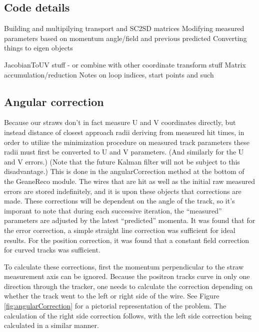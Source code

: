 \documentclass{article}
\begin{document}
\subsection{Code details}

Building and multipilying transport and SC2SD matrices
Modifying measured parameters based on momentum angle/field and previous predicted
Converting things to eigen objects

JacobianToUV stuff - or combine with other coordinate transform stuff
Matrix accumulation/reduction
Notes on loop indices, start points and such

\subsection{Angular correction}

Because our straws don't in fact measure U and V coordinates directly, but instead distance of closest approach radii deriving from measured hit times, in order to utilize the minimization procedure on measured track parameters these radii must first be converted to U and V parameters. (And similarly for the U and V errors.) (Note that the future Kalman filter will not be subject to this disadvantage.) This is done in the angularCorrection method at the bottom of the GeaneReco module. The wires that are hit as well as the initial raw measured errors are stored indefinitely, and it is upon these objects that corrections are made. These corrections will be dependent on the angle of the track, so it's imporant to note that during each successive iteration, the ``measured'' parameters are adjusted by the latest ``predicted'' momenta. It was found that for the error correction, a simple straight line correction was sufficient for ideal results. For the position correction, it was found that a constant field correction for curved tracks was sufficient.

To calculate these corrections, first the momentum perpendicular to the straw measurement axis can be ignored. Because the positron tracks curve in only one direction through the tracker, one needs to calculate the correction depending on whether the track went to the left or right side of the wire. See Figure \ref{fig:angularCorrection} for a pictorial representation of the problem. The calculation of the right side correction follows, with the left side correction being calculated in a similar manner.
\end{document}
